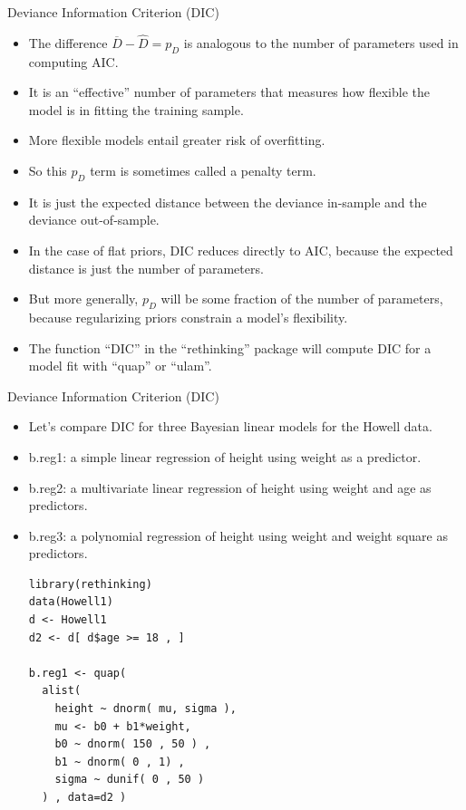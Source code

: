 \documentclass[handout]{beamer}
\begin{document}
\begin{frame}{Deviance Information Criterion (DIC)}
\scriptsize{

\begin{itemize}
\item The difference $\overline{D}-\hat{D} = p_D$ is analogous to the number of parameters used in computing AIC.
\item It is an ``effective'' number of parameters that measures how flexible the model is in
fitting the training sample. 
\item More flexible models entail greater risk of overfitting. 
\item So this $p_D$ term is sometimes called a penalty term.
\item It is just the expected distance between the deviance  in-sample and the deviance out-of-sample.
\item In the case of flat priors, DIC reduces directly to AIC, because the expected distance is just the number of parameters. 
\item But more generally, $p_D$  will be some fraction of the number of parameters, because regularizing priors constrain a model's flexibility.
\item The function ``DIC'' in the ``rethinking'' package will compute DIC for a model fit with ``quap'' or ``ulam''.

\end{itemize}


} 
\end{frame}


\begin{frame}[fragile]{Deviance Information Criterion (DIC)}
\scriptsize{

\begin{itemize}
\item Let's compare DIC for three Bayesian linear models for the Howell data.

\item b.reg1: a simple linear regression of height using weight as a predictor.

\item b.reg2: a multivariate linear regression of height using weight and age as predictors.

\item b.reg3: a polynomial regression of height using weight and weight square as predictors.

\begin{verbatim}
library(rethinking)
data(Howell1)
d <- Howell1
d2 <- d[ d$age >= 18 , ]

b.reg1 <- quap(
  alist(
    height ~ dnorm( mu, sigma ),
    mu <- b0 + b1*weight,
    b0 ~ dnorm( 150 , 50 ) ,
    b1 ~ dnorm( 0 , 1) ,
    sigma ~ dunif( 0 , 50 )
  ) , data=d2 )

\end{verbatim}



\end{itemize}


} 
\end{frame}
\end{document}
